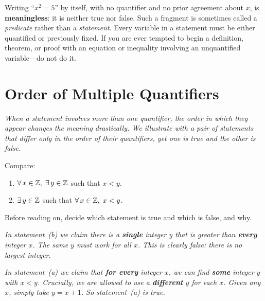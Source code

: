 \begin{remark}[Warning]
Writing ``$x^{2} = 5$'' by itself, with no quantifier and no prior agreement about $x$, is \textbf{meaningless}: it is neither true nor false.  Such a fragment is sometimes called a \emph{predicate} rather than a \emph{statement}.  Every variable in a statement must be either quantified or previously fixed.  If you are ever tempted to begin a definition, theorem, or proof with an equation or inequality involving an unquantified variable---do not do it.
\end{remark}

\section{Order of Multiple Quantifiers}
\label{sec:1.4}

\textit{When a statement involves more than one quantifier, the order in which they appear changes the meaning drastically.  We illustrate with a pair of statements that differ only in the order of their quantifiers, yet one is true and the other is false.}

\begin{example}
\label{ex:1-6}
Compare:
\begin{enumerate}[label=(\alph*)]
  \item $\forall\, x \in \mathbb{Z},\;\exists\, y \in \mathbb{Z}$ such that $x < y$.
  \item $\exists\, y \in \mathbb{Z}$ such that $\forall\, x \in \mathbb{Z},\; x < y$.
\end{enumerate}
\end{example}

\begin{remark}
Before reading on, decide which statement is true and which is false, and why.
\end{remark}

\textit{In statement~(b) we claim there is a \textbf{single} integer $y$ that is greater than \textbf{every} integer $x$.  The same $y$ must work for all $x$.  This is clearly false: there is no largest integer.}

\textit{In statement~(a) we claim that \textbf{for every} integer $x$, we can find \textbf{some} integer $y$ with $x < y$.  Crucially, we are allowed to use a \textbf{different} $y$ for each $x$.  Given any $x$, simply take $y = x + 1$.  So statement~(a) is true.}

